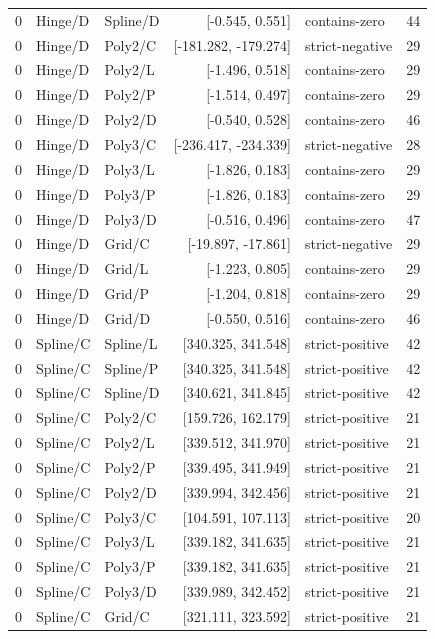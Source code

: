 \begin{longtable}{lllrlr}
0 & Hinge/D & Spline/D & [-0.545, 0.551] & contains-zero & 44 \\
0 & Hinge/D & Poly2/C & [-181.282, -179.274] & strict-negative & 29 \\
0 & Hinge/D & Poly2/L & [-1.496, 0.518] & contains-zero & 29 \\
0 & Hinge/D & Poly2/P & [-1.514, 0.497] & contains-zero & 29 \\
0 & Hinge/D & Poly2/D & [-0.540, 0.528] & contains-zero & 46 \\
0 & Hinge/D & Poly3/C & [-236.417, -234.339] & strict-negative & 28 \\
0 & Hinge/D & Poly3/L & [-1.826, 0.183] & contains-zero & 29 \\
0 & Hinge/D & Poly3/P & [-1.826, 0.183] & contains-zero & 29 \\
0 & Hinge/D & Poly3/D & [-0.516, 0.496] & contains-zero & 47 \\
0 & Hinge/D & Grid/C & [-19.897, -17.861] & strict-negative & 29 \\
0 & Hinge/D & Grid/L & [-1.223, 0.805] & contains-zero & 29 \\
0 & Hinge/D & Grid/P & [-1.204, 0.818] & contains-zero & 29 \\
0 & Hinge/D & Grid/D & [-0.550, 0.516] & contains-zero & 46 \\
0 & Spline/C & Spline/L & [340.325, 341.548] & strict-positive & 42 \\
0 & Spline/C & Spline/P & [340.325, 341.548] & strict-positive & 42 \\
0 & Spline/C & Spline/D & [340.621, 341.845] & strict-positive & 42 \\
0 & Spline/C & Poly2/C & [159.726, 162.179] & strict-positive & 21 \\
0 & Spline/C & Poly2/L & [339.512, 341.970] & strict-positive & 21 \\
0 & Spline/C & Poly2/P & [339.495, 341.949] & strict-positive & 21 \\
0 & Spline/C & Poly2/D & [339.994, 342.456] & strict-positive & 21 \\
0 & Spline/C & Poly3/C & [104.591, 107.113] & strict-positive & 20 \\
0 & Spline/C & Poly3/L & [339.182, 341.635] & strict-positive & 21 \\
0 & Spline/C & Poly3/P & [339.182, 341.635] & strict-positive & 21 \\
0 & Spline/C & Poly3/D & [339.989, 342.452] & strict-positive & 21 \\
0 & Spline/C & Grid/C & [321.111, 323.592] & strict-positive & 21 \\

\end{longtable}
